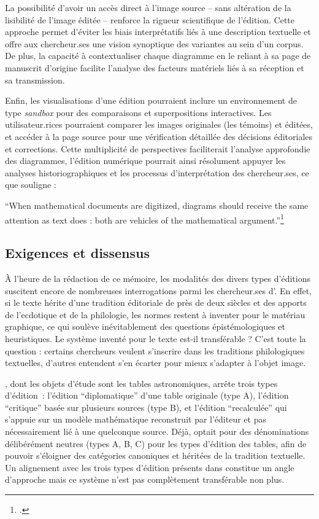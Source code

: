 La possibilité d'avoir un accès direct à l'image source -- sans
altération de la lisibilité de l'image éditée -- renforce la rigueur
scientifique de l'édition. Cette approche permet d'éviter les biais
interprétatifs liés à une description textuelle et offre aux chercheur.ses
une vision synoptique des variantes au sein d'un corpus. De plus, la
capacité à contextualiser chaque diagramme en le reliant à sa page de
manuscrit d'origine facilite l'analyse des facteurs matériels liés à sa
réception et sa transmission.

Enfin, les visualisations d'une édition pourraient inclure un
environnement de type \emph{sandbox} pour des comparaisons et superpositions
interactives. Les utilisateur.rices pourraient comparer les images originales
(les témoins) et éditées, et accéder à la page source pour une
vérification détaillée des décisions éditoriales et corrections. Cette
multiplicité de perspectives faciliterait l'analyse approfondie des
diagrammes, l'édition numérique pourrait ainsi résolument appuyer les
analyses historiographiques et les processus d'interprétation des
chercheur.ses, ce que souligne \citeauthor{roughan_digital_2014} :

\begin{kwote}
``When mathematical documents are digitized, diagrams should receive the
same attention as text does : both are vehicles of the mathematical
argument.''\footcite[p.78]{roughan_digital_2014}
\end{kwote}

\hypertarget{exigences-et-dissensus}{%
\subsection{Exigences et dissensus}\label{exigences-et-dissensus}}

À l'heure de la rédaction de ce mémoire, les modalités des divers types
d'éditions suscitent encore de nombreuses interrogations parmi les
chercheur.ses d'\eida. En effet, si le texte hérite d'une tradition
éditoriale de près de deux siècles et des apports de l'ecdotique et de
la philologie, les normes restent à inventer pour le matériau graphique,
ce qui soulève inévitablement des questions épistémologiques et
heuristiques. Le système inventé pour le texte est-il transférable ?
C'est toute la question : certains chercheurs veulent s'inscrire dans
les traditions philologiques textuelles, d'autres entendent s'en écarter
pour mieux s'adapter à l'objet image.

\dishas, dont les objets d'étude sont les tables astronomiques, arrête
trois types d'édition~: l'édition ``diplomatique'' d'une table originale
(type A), l'édition ``critique'' basée sur plusieurs sources (type B),
et l'édition ``recalculée'' qui s'appuie sur un modèle mathématique
reconstruit par l'éditeur et pas nécessairement lié à une quelconque
source. Déjà, \dishas optait pour des dénominations délibérément neutres
(types A, B, C) pour les types d'édition des tables, afin de pouvoir
s'éloigner des catégories canoniques et héritées de la tradition
textuelle. Un alignement avec les trois types d'édition présents dans
\dishas constitue un angle d'approche mais ce système n'est pas
complètement transférable non plus.


